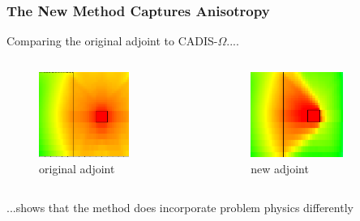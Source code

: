 \documentclass[xcolor=x11names,compress]{beamer}
\renewcommand{\(}{\begin{columns}}
\renewcommand{\)}{\end{columns}}
\newcommand{\<}[1]{\begin{column}{#1}}
\renewcommand{\>}{\end{column}}
\begin{document}
\begin{frame}[fragile]
  \frametitle{The New Method Captures Anisotropy}
Comparing the original adjoint to CADIS-$\Omega$....
  \begin{columns}
    \begin{column}{0.5\textwidth}
  	\begin{figure}
  	\begin{center}
  		\includegraphics[height=1.1in,clip]{../figs/maze-adj-orig.png}
		\caption{original adjoint}
	\end{center}
  	\end{figure}
    \end{column}
  \pause
    \begin{column}{0.5\textwidth}
     	  \begin{figure}
  	\begin{center}
  		\includegraphics[height=1.1in,clip]{../figs/maze-adj-new}
		\caption{new adjoint}
	\end{center}
  	\end{figure}
  	\end{column}  
  \end{columns}
  ...shows that the method does incorporate problem physics differently
\end{frame}
\end{document}

